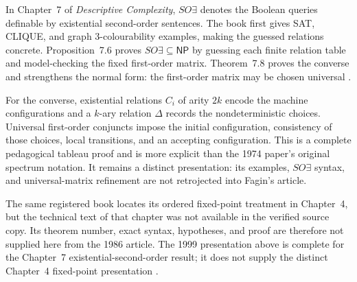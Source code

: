 In Chapter~7 of \emph{Descriptive Complexity}, \(SO\exists\) denotes the
Boolean queries definable by existential second-order sentences.  The book
first gives SAT, CLIQUE, and graph 3-colourability examples, making the guessed
relations concrete.  Proposition~7.6 proves \(SO\exists\subseteq\mathsf{NP}\)
by guessing each finite relation table and model-checking the fixed first-order
matrix.  Theorem~7.8 proves the converse and strengthens the normal form: the
first-order matrix may be chosen universal
\cite[pp.~143--148]{Immerman1999}.

For the converse, existential relations \(C_i\) of arity \(2k\) encode the
machine configurations and a \(k\)-ary relation \(\Delta\) records the
nondeterministic choices.  Universal first-order conjuncts impose the initial
configuration, consistency of those choices, local transitions, and an
accepting configuration.  This is a complete pedagogical tableau proof and is
more explicit than the 1974 paper's original spectrum notation.  It remains a
distinct presentation: its examples, \(SO\exists\) syntax, and universal-matrix
refinement are not retrojected into Fagin's article.

The same registered book locates its ordered fixed-point treatment in
Chapter~4, but the technical text of that chapter was not available in the
verified source copy.  Its theorem number, exact syntax, hypotheses, and proof
are therefore not supplied here from the 1986 article.  The 1999 presentation
above is complete for the Chapter~7 existential-second-order result; it does
not supply the distinct Chapter~4 fixed-point presentation
\cite{Immerman1999}.
